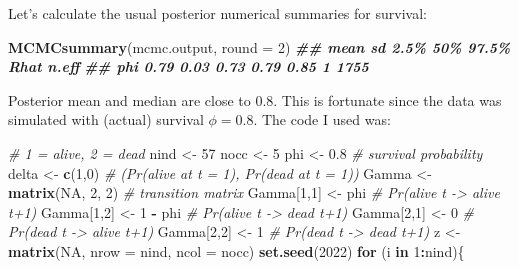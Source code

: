 \documentclass[
  12pt,
]{krantz}
\newenvironment{Shaded}{\begin{snugshade}}{\end{snugshade}}
\newcommand{\AttributeTok}[1]{\textcolor[rgb]{0.13,0.29,0.53}{#1}}
\newcommand{\CommentTok}[1]{\textcolor[rgb]{0.56,0.35,0.01}{\textit{#1}}}
\newcommand{\ConstantTok}[1]{\textcolor[rgb]{0.56,0.35,0.01}{#1}}
\newcommand{\ControlFlowTok}[1]{\textcolor[rgb]{0.13,0.29,0.53}{\textbf{#1}}}
\newcommand{\DecValTok}[1]{\textcolor[rgb]{0.00,0.00,0.81}{#1}}
\newcommand{\DocumentationTok}[1]{\textcolor[rgb]{0.56,0.35,0.01}{\textbf{\textit{#1}}}}
\newcommand{\FloatTok}[1]{\textcolor[rgb]{0.00,0.00,0.81}{#1}}
\newcommand{\FunctionTok}[1]{\textcolor[rgb]{0.13,0.29,0.53}{\textbf{#1}}}
\newcommand{\NormalTok}[1]{#1}
\newcommand{\OtherTok}[1]{\textcolor[rgb]{0.56,0.35,0.01}{#1}}
\newcommand{\SpecialCharTok}[1]{\textcolor[rgb]{0.81,0.36,0.00}{\textbf{#1}}}
\begin{document}
Let's calculate the usual posterior numerical summaries for survival:

\begin{Shaded}
\begin{Highlighting}[]
\FunctionTok{MCMCsummary}\NormalTok{(mcmc.output, }\AttributeTok{round =} \DecValTok{2}\NormalTok{)}
\DocumentationTok{\#\#     mean   sd 2.5\%  50\% 97.5\% Rhat n.eff}
\DocumentationTok{\#\# phi 0.79 0.03 0.73 0.79  0.85    1  1755}
\end{Highlighting}
\end{Shaded}

Posterior mean and median are close to \(0.8\). This is fortunate since the data was simulated with (actual) survival \(\phi = 0.8\). The code I used was:

\begin{Shaded}
\begin{Highlighting}[]
\CommentTok{\# 1 = alive, 2 = dead}
\NormalTok{nind }\OtherTok{\textless{}{-}} \DecValTok{57}
\NormalTok{nocc }\OtherTok{\textless{}{-}} \DecValTok{5}
\NormalTok{phi }\OtherTok{\textless{}{-}} \FloatTok{0.8} \CommentTok{\# survival probability}
\NormalTok{delta }\OtherTok{\textless{}{-}} \FunctionTok{c}\NormalTok{(}\DecValTok{1}\NormalTok{,}\DecValTok{0}\NormalTok{) }\CommentTok{\# (Pr(alive at t = 1), Pr(dead at t = 1))}
\NormalTok{Gamma }\OtherTok{\textless{}{-}} \FunctionTok{matrix}\NormalTok{(}\ConstantTok{NA}\NormalTok{, }\DecValTok{2}\NormalTok{, }\DecValTok{2}\NormalTok{) }\CommentTok{\# transition matrix}
\NormalTok{Gamma[}\DecValTok{1}\NormalTok{,}\DecValTok{1}\NormalTok{] }\OtherTok{\textless{}{-}}\NormalTok{ phi      }\CommentTok{\# Pr(alive t {-}\textgreater{} alive t+1)}
\NormalTok{Gamma[}\DecValTok{1}\NormalTok{,}\DecValTok{2}\NormalTok{] }\OtherTok{\textless{}{-}} \DecValTok{1} \SpecialCharTok{{-}}\NormalTok{ phi  }\CommentTok{\# Pr(alive t {-}\textgreater{} dead t+1)}
\NormalTok{Gamma[}\DecValTok{2}\NormalTok{,}\DecValTok{1}\NormalTok{] }\OtherTok{\textless{}{-}} \DecValTok{0}        \CommentTok{\# Pr(dead t {-}\textgreater{} alive t+1)}
\NormalTok{Gamma[}\DecValTok{2}\NormalTok{,}\DecValTok{2}\NormalTok{] }\OtherTok{\textless{}{-}} \DecValTok{1}        \CommentTok{\# Pr(dead t {-}\textgreater{} dead t+1)}
\NormalTok{z }\OtherTok{\textless{}{-}} \FunctionTok{matrix}\NormalTok{(}\ConstantTok{NA}\NormalTok{, }\AttributeTok{nrow =}\NormalTok{ nind, }\AttributeTok{ncol =}\NormalTok{ nocc)}
\FunctionTok{set.seed}\NormalTok{(}\DecValTok{2022}\NormalTok{)}
\ControlFlowTok{for}\NormalTok{ (i }\ControlFlowTok{in} \DecValTok{1}\SpecialCharTok{:}\NormalTok{nind)\{}

\end{Highlighting}
\end{Shaded}
\end{document}
